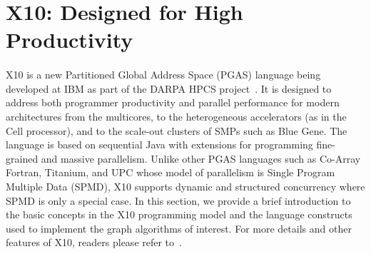 \section{X10: Designed for High Productivity}
\paragraph{}X10 is a new Partitioned Global Address Space (PGAS) language being developed at IBM as part of the DARPA HPCS project~\cite{X10-OOPSLA05}. It is designed to address both programmer productivity and parallel performance for modern architectures from the multicores, to the heterogeneous accelerators (as in the Cell processor), and to the scale-out clusters of SMPs such as Blue Gene.  The language is based on sequential Java with extensions for programming fine-grained and massive parallelism. Unlike other PGAS languages such as Co-Array Fortran, Titanium, and UPC whose model of parallelism is Single Program Multiple Data (SPMD), X10 supports dynamic and structured concurrency where SPMD is only a special case. In this section, we provide a brief introduction to the basic concepts in the X10 programming model and the language constructs used to implement the graph algorithms of interest. For more details and other features of X10, readers please refer to~\cite{X10-OOPSLA05}.
 
